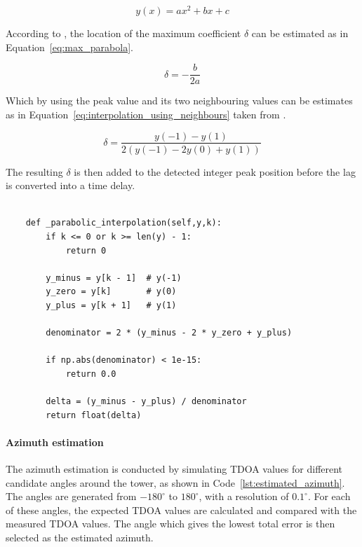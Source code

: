     \begin{equation}
    \label{eq:parabola}
    y(x) = ax^2 + bx + c
    \end{equation}

    According to \cite{lai1999interpolation}, the location of the maximum coefficient $\delta$ can be estimated as in Equation~\ref{eq:max_parabola}.

    \begin{equation}
        \label{eq:max_parabola}
        \delta = -\frac{b}{2a}
    \end{equation}

    Which by using the peak value and its two neighbouring values can be estimates as in Equation~\ref{eq:interpolation_using_neighbours} taken from \cite{lai1999interpolation}.

    \begin{equation}
        \label{eq:interpolation_using_neighbours}
        \delta =\frac{y(-1)-y(1)}{2\left(y(-1)-2y(0)+y(1)\right)}
    \end{equation}

     The resulting $\delta$ is then added to the detected integer peak position before the lag is converted into a time delay. 
     
    
    \begin{lstlisting}[style=pythonstyle, caption={Function used for interpolation, based on \cite{lai1999interpolation}.}, label={lst:parabolic_interpolation}]

    def _parabolic_interpolation(self,y,k):
        if k <= 0 or k >= len(y) - 1:
            return 0

        y_minus = y[k - 1]  # y(-1)
        y_zero = y[k]       # y(0)
        y_plus = y[k + 1]   # y(1)

        denominator = 2 * (y_minus - 2 * y_zero + y_plus)

        if np.abs(denominator) < 1e-15:
            return 0.0
    
        delta = (y_minus - y_plus) / denominator
        return float(delta)

    \end{lstlisting}
    \newpage
    \paragraph{Azimuth estimation}

    The azimuth estimation is conducted by simulating TDOA values for different candidate angles around the tower, as shown in Code~\ref{lst:estimated_azimuth}. The angles are generated from \(-180^\circ\) to \(180^\circ\), with a resolution of \(0.1^\circ\). For each of these angles, the expected TDOA values are calculated and compared with the measured TDOA values. The angle which gives the lowest total error is then selected as the estimated azimuth.

